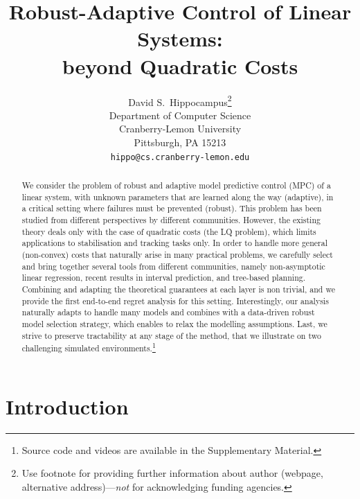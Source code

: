 \documentclass{article}
\title{Robust-Adaptive Control of Linear Systems:\\ beyond Quadratic Costs}
\author{%
	David S.~Hippocampus\thanks{Use footnote for providing further information
		about author (webpage, alternative address)---\emph{not} for acknowledging
		funding agencies.} \\
	Department of Computer Science\\
	Cranberry-Lemon University\\
	Pittsburgh, PA 15213 \\
	\texttt{hippo@cs.cranberry-lemon.edu} \\
}
\begin{document}
	
\maketitle

\begin{abstract}
We consider the problem of robust and adaptive model predictive control (MPC) of a linear system, with unknown parameters that are learned along the way (adaptive), in a critical setting where failures must be prevented (robust). This problem has been studied from different perspectives by different communities. However, the existing theory deals only with the case of quadratic costs (the LQ problem), which limits applications to stabilisation and tracking tasks only. In order to handle more general (non-convex) costs that naturally arise in many practical problems, we carefully select and bring together several tools from different communities, namely non-asymptotic linear regression, recent results in interval prediction, and tree-based planning. Combining and adapting the theoretical guarantees at each layer is non trivial, and we provide the first end-to-end regret analysis for this setting. Interestingly, our analysis naturally adapts to handle many models and combines with a data-driven robust model selection strategy, which enables to relax the modelling assumptions. Last, we strive to preserve tractability at any stage of the method, that we illustrate on two challenging simulated environments.\footnote{Source code and videos are available in the Supplementary Material.}
\end{abstract}	




\section{Introduction}
\end{document}
